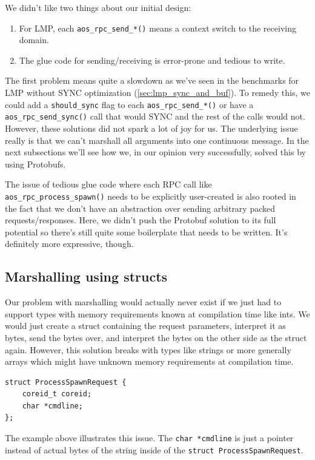 We didn't like two things about our initial design:
\begin{enumerate}
    \item For LMP, each \texttt{aos_rpc_send_*()} means a context switch to the receiving domain.
    \item The glue code for sending/receiving is error-prone and tedious to write.
\end{enumerate}

The first problem means quite a slowdown as we've seen in the benchmarks for LMP without SYNC optimization (\autoref{sec:lmp_sync_and_buf}). To remedy this, we could add a \texttt{should_sync} flag to each \texttt{aos_rpc_send_*()} or have a \texttt{aos_rpc_send_sync()} call that would SYNC and the rest of the calls would not. However, these solutions did not spark a lot of joy for us. The underlying issue really is that we can't marshall all arguments into one continuous message. In the next subsections we'll see how we, in our opinion very successfully, solved this by using Protobufs.

The issue of tedious glue code where each RPC call like \texttt{aos_rpc_process_spawn()} needs to be explicitly user-created is also rooted in the fact that we don't have an abstraction over sending arbitrary packed requests/responses. Here, we didn't push the Protobuf solution to its full potential so there's still quite some boilerplate that needs to be written. It's definitely more expressive, though.

\subsection{Marshalling using structs}
Our problem with marshalling would actually never exist if we just had to support types with memory requirements known at compilation time like ints. We would just create a struct containing the request parameters, interpret it as bytes, send the bytes over, and interpret the bytes on the other side as the struct again. However, this solution breaks with types like strings or more generally arrays which might have unknown memory requirements at compilation time.

\begin{verbatim}
struct ProcessSpawnRequest {
    coreid_t coreid;
    char *cmdline;
};
\end{verbatim}

The example above illustrates this issue. The \texttt{char *cmdline} is just a pointer instead of actual bytes of the string inside of the \texttt{struct ProcessSpawnRequest}.

